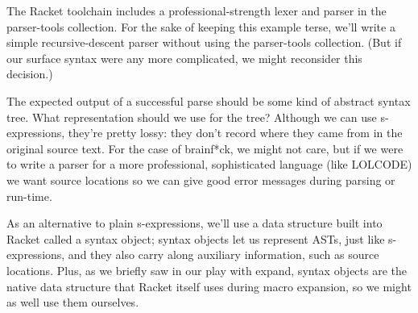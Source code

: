 \documentclass{article}
\begin{document}
The Racket toolchain includes a professional-strength lexer and parser in the parser-tools collection. For the sake of keeping this example terse, we’ll write a simple recursive-descent parser without using the parser-tools collection. (But if our surface syntax were any more complicated, we might reconsider this decision.)

The expected output of a successful parse should be some kind of abstract syntax tree. What representation should we use for the tree? Although we can use s-expressions, they’re pretty lossy: they don’t record where they came from in the original source text. For the case of brainf*ck, we might not care, but if we were to write a parser for a more professional, sophisticated language (like LOLCODE) we want source locations so we can give good error messages during parsing or run-time.

As an alternative to plain s-expressions, we’ll use a data structure built into Racket called a syntax object; syntax objects let us represent ASTs, just like s-expressions, and they also carry along auxiliary information, such as source locations. Plus, as we briefly saw in our play with expand, syntax objects are the native data structure that Racket itself uses during macro expansion, so we might as well use them ourselves.
\end{document}
